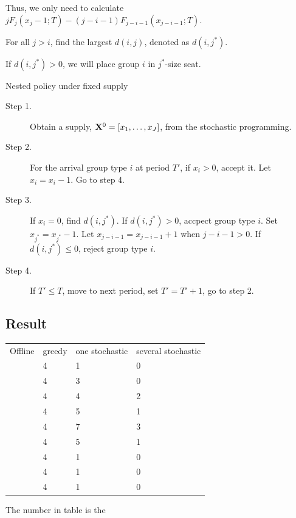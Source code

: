 Thus, we only need to calculate $j F_{j}(x_{j}-1; T) - (j-i-1) F_{j-i-1}(x_{j-i-1}; T)$.

For all $j >i$, find the largest $d(i,j)$, denoted as $d(i,j^{*})$.

If $d(i,j^{*}) >0$, we will place group $i$ in $j^{*}$-size seat.

\begin{algorithm}[H]\label{several_class}
  \caption{Nested policy under fixed supply}
  \begin{description}
    \item[Step 1.] Obtain a supply, $\mathbf{X}^{0} = [x_1,\ldots,x_{J}]$, from the stochastic programming.
    \item[Step 2.] For the arrival group type $i$ at period $T{'}$, if $x_{i} > 0$, accept it. Let $x_{i} = x_{i} -1$. Go to step 4.
    \item[Step 3.] If $x_{i} = 0$, find $d(i,j^{*})$. If $d(i,j^{*})>0$, accpect group type $i$. Set $x_{j^{*}} = x_{j^{*}} -1$. Let $x_{j-i-1} = x_{j-i-1} + 1$ when $j-i-1>0$. If $d(i,j^{*}) \leq 0$, reject group type $i$.
    \item[Step 4.] If $T{'} \leq T$, move to next period, set $T{'} = T{'}+1$, go to step 2.
  \end{description}
\end{algorithm}

\subsection{Result}

\begin{table}[ht]
  \begin{tabular}{l|l|l|l}
  \hline
  Offline & greedy & one stochastic & several stochastic \\
    & 4  & 1 & 0 \\
    & 4  & 3 & 0 \\
    & 4  & 4 & 2  \\
    & 4  & 5 & 1 \\
    & 4  & 7 & 3  \\
    & 4  & 5 & 1  \\
    & 4  & 1 & 0  \\
    & 4  & 1 & 0 \\
    & 4  & 1 & 0 \\
  \hline
  \end{tabular}
\end{table}

The number in table is the 

